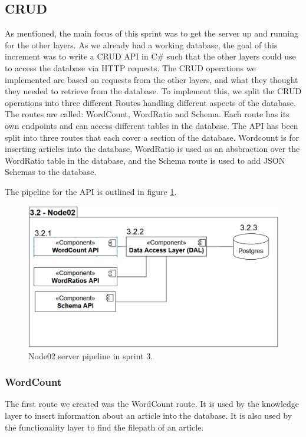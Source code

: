 \subsection{CRUD}

As mentioned, the main focus of this sprint was to get the server up and running for the other layers. 
As we already had a working database, the goal of this increment was to write a CRUD API in C\# such that the other layers could use to access the database via HTTP requests.
The CRUD operations we implemented are based on requests from the other layers, and what they thought they needed to retrieve from the database.
To implement this, we split the CRUD operations into three different Routes handling different aspects of the database. The routes are called: WordCount, WordRatio and Schema. Each route has its own endpoints and can access different tables in the database. The API has been split into three routes that each cover a section of the database. Wordcount is for inserting articles into the database, WordRatio is used as an absbraction over the WordRatio table in the database, and the Schema route is used to add JSON Schemas to the database.

The pipeline for the API is outlined in figure \ref{Node02Sprint3}.

\begin{figure}[h]
    \centering
    \includegraphics[width=\linewidth]{Images/Node02Sprint3.PNG}
    \caption{Node02 server pipeline in sprint 3.}
    \label{Node02Sprint3}
\end{figure}

\subsubsection{WordCount}

The first route we created was the WordCount route. It is used by the knowledge layer to insert information about an article into the database. It is also used by the functionality layer to find the filepath of an article.


